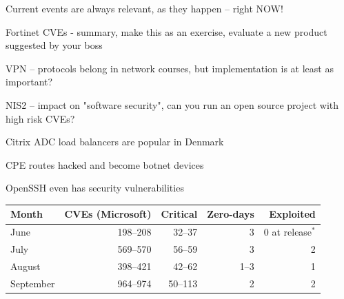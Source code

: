 \documentclass[Screen16to9,17pt]{foils}
\begin{document}

Current events are always relevant, as they happen -- right NOW!
\begin{list2}
\item Fortinet CVEs - summary, make this as an exercise, evaluate a new product suggested by your boss
\item VPN -- protocols belong in network courses, but implementation is at least as important?
\item NIS2 -- impact on "software security", can you run an open source project with high risk CVEs?
\item Citrix ADC load balancers are popular in Denmark
\item CPE routes hacked and become botnet devices
\item OpenSSH even has security vulnerabilities
\end{list2}







\begin{tabularx}{22cm}{|X|r| r|r|r|}\hline
Month & CVEs (Microsoft) & Critical & Zero-days & Exploited \\\hline
June  & 198--208  & 32--37 & 3 & 0 at release$^{*}$ \\\hline
July  & 569--570  & 56--59 & 3 & 2 \\\hline
August & 398--421 & 42--62 & 1--3 & 1 \\\hline
September & 964--974 & 50--113 & 2 & 2 \\\hline
\end{tabularx}
\end{document}
